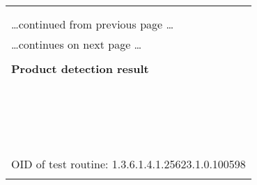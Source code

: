 \documentclass{article}
\begin{document}
\begin{longtable}{|p{}|}
\hline
\rowcolor{openvas_warning}{\color{white}{Medium (CVSS: 2.6) }}\\
\rowcolor{openvas_warning}{\color{white}{NVT: Apache Tomcat Authentication Header Realm Name Information Disclosure Vulnerability}}\\
\hline
\endfirsthead
\hfill\ldots continued from previous page \ldots \\
\hline
\endhead
\hline
\ldots continues on next page \ldots \\
\endfoot
\hline
\endlastfoot
\\
\textbf{Product detection result}\\
\rowcolor{white}{\verb=cpe:/a:apache:tomcat:6.0.24=}\\
\rowcolor{white}{\verb=Detected by Apache Tomcat Version Detection (OID: 1.3.6.1.4.1.25623.1.0.800371)=}\\
\\
\hline
\\
\rowcolor{white}{\verb= Summary:=}\\
\rowcolor{white}{\verb= Apache Tomcat is prone to a remote information-disclosure=}\\
\rowcolor{white}{\verb=vulnerability.=}\\
\rowcolor{white}{\verb=Remote attackers can exploit this issue to obtain the host name or IP=}\\
\rowcolor{white}{\verb=address of the Tomcat server. Information harvested may lead to=}\\
\rowcolor{white}{\verb=further attacks.=}\\
\rowcolor{white}{\verb=The following versions are affected:=}\\
\rowcolor{white}{\verb=Tomcat 5.5.0 through 5.5.29 Tomcat 6.0.0 through 6.0.26=}\\
\rowcolor{white}{\verb=Tomcat 3.x, 4.0.x, and 5.0.x may also be affected.=}\\
\rowcolor{white}{\verb= Solution:=}\\
\rowcolor{white}{\verb= Updates are available. Please see the references for more information.=}\\
\rowcolor{white}{\verb==}\\
\rowcolor{white}{\verb==}\\
\\
OID of test routine: 1.3.6.1.4.1.25623.1.0.100598\\
\\


\end{longtable}
\end{document}
